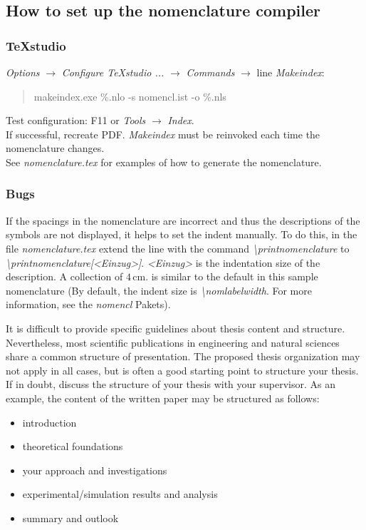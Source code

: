 \subsection*{How to set up the nomenclature compiler}

\subsubsection{TeXstudio}
\textit{Options} $\rightarrow$ \textit{Configure TeXstudio ...} $\rightarrow$ \textit{Commands} $\rightarrow$ line \textit{Makeindex}:
\begin{quotation}
makeindex.exe \%.nlo -s nomencl.ist -o \%.nls 
\end{quotation}

\noindent Test configuration: F11 or \textit{Tools} $\rightarrow$ \textit{Index}. \\
If successful, recreate PDF. \textit{Makeindex} must be reinvoked each time the nomenclature changes. \\
See \textit{nomenclature.tex} for examples of how to generate the nomenclature.

\subsubsection{Bugs}

If the spacings in the nomenclature are incorrect and thus the descriptions of the symbols are not displayed, it helps to set the indent manually.
To do this, in the file \textit{nomenclature.tex} extend the line with the command \textit{\textbackslash printnomenclature} to \textit{\textbackslash printnomenclature[<Einzug>]}.
\textit{<Einzug>} is the indentation size of the description.
A collection of $4\,\mathrm{cm}$. is similar to the default in this sample nomenclature (By default, the indent size is \textit{\textbackslash nomlabelwidth}.
For more information, see the \textit{nomencl} Pakets).


It is difficult to provide specific guidelines about thesis content and structure.
Nevertheless, most scientific publications in engineering and
natural sciences share a common structure of presentation.
The proposed thesis organization may not apply in all cases, but is often a good
starting point to structure your thesis.
If in doubt, discuss the structure of your thesis with your supervisor.
As an example, the content of the written paper may be structured as follows:

\begin{itemize}
	\item introduction
	\item theoretical foundations
	\item your approach and investigations
	\item experimental/simulation results and analysis
	\item summary and outlook
\end{itemize}
